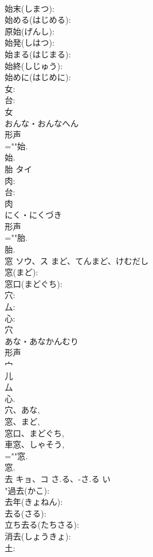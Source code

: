 \documentclass[8pt]{extreport}
\begin{document}
\begin{CJK}{UTF8}{min}
\\	始末(しまつ): 
\\	始める(はじめる): 
\\	原始(げんし): 
\\	始発(しはつ): 
\\	始まる(はじまる): 
\\	始終(しじゅう): 
\\	始めに(はじめに): 
\\	女: 
\\	台: 
\\	女	
\\	おんな・おんなへん	
\\	形声 
\\	=""始.
\\	始.
\\	胎	タイ			
\\	肉: 
\\	台: 
\\	肉	
\\	にく・にくづき	
\\	形声 
\\	=""胎.
\\	胎.
\\	窓	ソウ、ス	まど、てんまど、けむだし		
\\	窓(まど): 
\\	窓口(まどぐち): 
\\	穴: 
\\	厶: 
\\	心: 
\\	穴	
\\	あな・あなかんむり	
\\	形声 
\\	宀 
\\	儿 
\\	厶 
\\	心. 
\\	穴、あな, 
\\	窓、まど, 
\\	窓口、まどぐち, 
\\	車窓、しゃそう, 
\\	=""窓.
\\	窓.
\\	去	キョ、コ	さ.る、-さ.る	い	
\\	"過去(かこ): 
\\	去年(きょねん): 
\\	去る(さる): 
\\	立ち去る(たちさる): 
\\	消去(しょうきょ): 
\\	土: 

\end{CJK}
\end{document}
